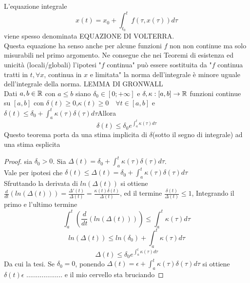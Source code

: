 \observation
L'equazione integrale 
$$x(t)=x_0+\int_{t_0}^{t}f(\tau,x(\tau))d\tau$$
viene spesso denominata EQUAZIONE DI VOLTERRA.\\
Questa equazione ha senso anche per alcune funzioni $f$ non non continue ma solo misurabili nel primo argomento. Ne consegue che nei Teoremi di esistenza ed unicità (locali/globali) l'ipotesi "$f$ continua" può essere sostituita da "$f$ continua tratti in $t, \forall x$, continua in $x$ e limitata"
\observation
la norma dell'integrale è minore uguale dell'integrale della norma.
\proposition LEMMA DI GRONWALL\\
Dati $a,b\in \mathbb{R}$ con $a\le b$ siano $\delta_0\in \left[ 0;+\infty \right]$ e $\delta,\kappa:\left[a,b\right]\to \mathbb{R}$ funzioni continue su $\left[a,b\right]$ con $\delta(t)\ge 0$,$\kappa(t)\ge 0 \quad \forall t\in\left[ a,b\right] $ e $\delta(t)\le \delta_0+\int_{a}^{t}\kappa(\tau)\delta(\tau)d\tau$Allora $$\delta(t)\le\delta_0e^{\int_{a}^{t}\kappa(\tau)d\tau}$$
Questo teorema porta da una stima implicita di $\delta$(sotto il segno di integrale) ad una stima esplicita 
\begin{proof}
	sia $\delta_0 > 0$. Sia $\Delta(t)=\delta_0+\int_{a}^{t}\kappa(\tau)\delta(\tau)d\tau$.\\
	Vale per ipotesi che $\delta(t)\le\Delta(t)=\delta_0+\int_{a}^{t}\kappa(\tau)\delta(\tau)d\tau$\\
	Sfruttando la derivata di $ln(\Delta(t))$ si ottiene $\frac{d}{dt}(ln(\Delta(t)))= \frac{\Delta'(t)}{\Delta(t)}=\frac{\kappa(t)\delta(t)}{\Delta(t)}$, ed il termine $\frac{\delta(t)}{\Delta(t)}\le 1$, Integrando il primo e l'ultimo termine
	$$\int_{a}^{t}\left( \frac{d}{dt}\left(ln(\Delta(t))\right) \right)\le\int_{a}^{t}\kappa(\tau)d\tau$$
	$$ln(\Delta(t))\le ln(\delta_0)+\int_{a}^{t}\kappa(\tau)d\tau$$
	$$ \Delta(t)\le\delta_0e^{\int_{a}^{t}\kappa(\tau)d\tau} $$
	Da cui la tesi.
	Se $\delta_0=0$, ponendo $\Delta(t)=\epsilon+\int_{a}^{t}\kappa(\tau)\delta(\tau)d\tau$ si ottiene $\delta(t)\epsilon$ ................... e il mio cervello sta bruciando
\end{proof}

